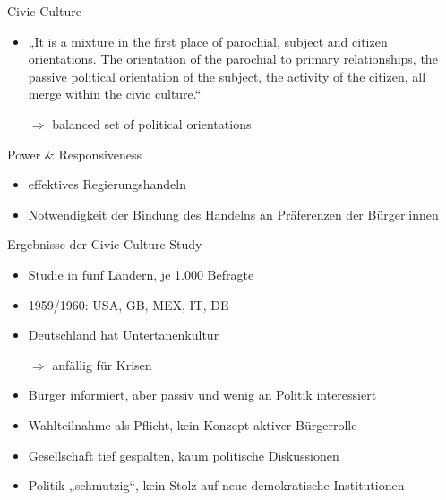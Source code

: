 \documentclass[11pt]{beamer}
\begin{document}
\begin{frame}[t]{Civic Culture}
	\begin{itemize}
		\item „It is a mixture in the first place of parochial, subject and citizen orientations. The orientation of the parochial to primary relationships, the passive political orientation of the subject, the activity of the citizen, all merge within the civic culture.“ \parencite[360]{Almond1980a} \pause
		\item[$\Rightarrow$] balanced set of political orientations
	\end{itemize}

\end{frame}


\begin{frame}[t]{Power \& Responsiveness}
	\begin{itemize}
		\item effektives Regierungshandeln \pause
	\end{itemize}
	
	\begin{itemize}
		\item Notwendigkeit der Bindung des Handelns an Präferenzen der Bürger:innen
	\end{itemize}
\end{frame}

\begin{frame}[t]{Ergebnisse der Civic Culture Study}
	\begin{itemize}
		\item Studie in fünf Ländern, je 1.000 Befragte
		\item 1959/1960: USA, GB, MEX, IT, DE
		\item  Deutschland hat Untertanenkultur \pause
		\item[$\Rightarrow$] anfällig für Krisen \pause
		\item Bürger informiert, aber passiv und wenig an Politik interessiert
		\item Wahlteilnahme als Pflicht, kein Konzept aktiver Bürgerrolle
		\item Gesellschaft tief gespalten, kaum politische Diskussionen
		\item Politik „schmutzig“, kein Stolz auf neue demokratische Institutionen
	\end{itemize}

\end{frame}
\end{document}
